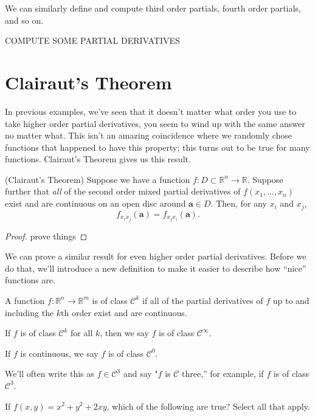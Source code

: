 \documentclass{ximera}
\begin{document}
We can similarly define and compute third order partials, fourth order partials, and so on.

\begin{example}
COMPUTE SOME PARTIAL DERIVATIVES
\end{example}

\section{Clairaut's Theorem}

In previous examples, we've seen that it doesn't matter what order you use to take higher order partial derivatives, you seem to wind up with the same answer no matter what. This isn't an amazing coincidence where we randomly chose functions that happened to have this property; this turns out to be true for many functions. Clairaut's Theorem gives us this result.

\begin{theorem}
(Clairaut's Theorem) Suppose we have a function $f:D\subset \mathbb{R}^n\rightarrow \mathbb{R}$. Suppose further that \emph{all} of the second order mixed partial derivatives of $f(x_1,...,x_n)$ exist and are continuous on an open disc around $\mathbf{a}\in D$. Then, for any $x_i$ and $x_j$,
\[
f_{x_ix_j}(\mathbf{a})=f_{x_jx_i}(\mathbf{a}).
\]
\end{theorem}

\begin{proof}
prove things
\end{proof}

We can prove a similar result for even higher order partial derivatives. Before we do that, we'll introduce a new definition to make it easier to describe how ``nice'' functions are.

\begin{definition}
A function $f:\mathbb{R}^n\rightarrow\mathbb{R}^m$ is of class $\mathcal{C}^k$ if all of the partial derivatives of $f$ up to and including the $k$th order exist and are continuous.

If $f$ is of class $\mathcal{C}^k$ for all $k$, then we say $f$ is of class $\mathcal{C}^\infty$.

If $f$ is continuous, we say $f$ is of class $\mathcal{C}^0$.
\end{definition}

We'll often write this as $f\in\mathcal{C}^3$ and say "$f$ is $\mathcal{C}$ three,'' for example, if $f$ is of class $\mathcal{C}^3$.

\begin{problem}
If $f(x,y) = x^2+y^2+2xy$, which of the following are true? Select all that apply.
\begin{selectAll}
\end{selectAll}
\end{problem}
\end{document}
